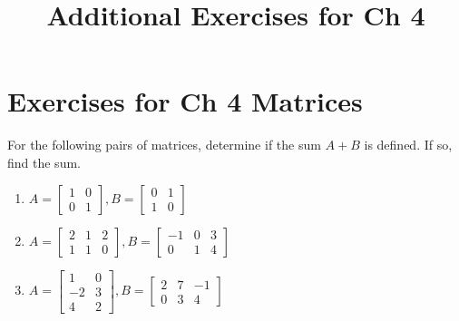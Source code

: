 \documentclass{ximera}
\title{Additional Exercises for Ch 4} \license{CC BY-NC-SA 4.0}
\begin{document}
\begin{abstract}
\end{abstract}
\maketitle

\section*{Exercises for Ch 4 Matrices}

\begin{problem}\label{prb:4.1} For the following pairs of matrices, determine if the sum $A + B$ is defined. If so, find the sum.
\begin{enumerate}
\item
$A = \left[ \begin{array}{rr}
1 & 0 \\
0 & 1
\end{array} \right],
B = \left[ \begin{array}{rr}
0 & 1 \\
1 & 0
\end{array} \right]$

\item
$A = \left[ \begin{array}{rrr}
2 & 1 & 2 \\
1 & 1 & 0
\end{array} \right],  B = \left[ \begin{array}{rrr}
-1 & 0 & 3\\
0 & 1 & 4
\end{array} \right]$

\item
$A = \left[ \begin{array}{rr}
1 & 0 \\
-2 & 3 \\
4 & 2
\end{array} \right], B = \left[ \begin{array}{rrr}
2 & 7 & -1 \\
0 & 3 & 4
\end{array} \right]$
\end{enumerate}
\end{problem}
\end{document}
